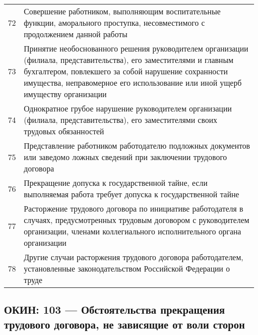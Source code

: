 \documentclass[10pt, a4paper, titlepage]{article}
\begin{document}
\begin{center}
\begin{longtable}{rp{}}
        72 & Совершение работником, выполняющим воспитательные функции, аморального проступка, несовместимого с продолжением данной работы \\
        73 & Принятие необоснованного решения руководителем организации (филиала, представительства), его заместителями и главным бухгалтером, повлекшего за собой нарушение сохранности имущества, неправомерное его использование или иной ущерб имуществу организации \\
        74 & Однократное грубое нарушение руководителем организации (филиала, представительства), его заместителями своих трудовых обязанностей \\
        75 & Представление работником работодателю подложных документов или заведомо ложных сведений при заключении трудового договора \\
        76 & Прекращение допуска к государственной тайне, если выполняемая работа требует допуска к государственной тайне \\
        77 & Расторжение трудового договора по инициативе работодателя в случаях, предусмотренных трудовым договором с руководителем организации, членами коллегиального исполнительного органа организации \\
        78 & Другие случаи расторжения трудового договора работодателем, установленные законодательством Российской Федерации о труде \\
    \end{longtable}
\end{center}

\subsection{ОКИН: 103 --- Обстоятельства прекращения трудового договора, не зависящие от воли сторон}
\end{document}
